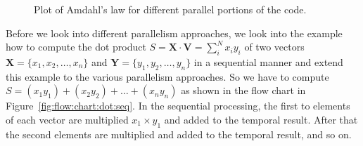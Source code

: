 \begin{figure}[tb]
\centering
\caption{Plot of Amdahl's law for different parallel portions of the code.}
\label{fig:amdals:law}
\end{figure}

Before we look into different parallelism approaches, we look into the example how to compute the dot product $S = \mathbf{X} \cdot \mathbf{V} = \sum_i^N x_i y_i$ of two vectors $\mathbf{X} = \lbrace x_1,x_2,\ldots,x_n \rbrace$ and $\mathbf{Y} = \lbrace y_1,y_2,\ldots,y_n \rbrace$  in a sequential manner and extend this example to the various parallelism approaches. So we have to compute $S = (x_1y_1) + (x_2y_2) + \ldots + (x_n y_n)$ as shown in the flow chart in Figure~\ref{fig:flow:chart:dot:seq}. In the sequential processing, the first to elements of each vector are multiplied $x_1 \times y_1$ and added to the temporal result. After that the second elements are multiplied and added to the temporal result, and so on. \\

